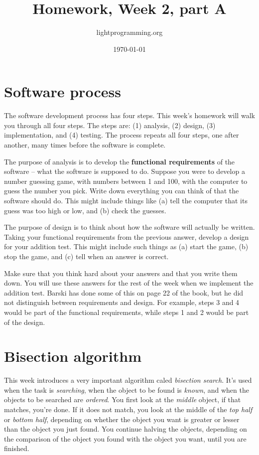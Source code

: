 \documentclass{article}
\title{Homework, Week 2, part A}
\author{lightprogramming.org}
\date{\today}
\begin{document}
\maketitle{}

\section{Software process}

The software development process has four steps. This week's homework will walk you through all four steps. The steps are: (1) analysis, (2) design, (3) implementation, and (4) testing. The process repeats all four steps, one after another, many times before the software is complete.

The purpose of analysis is to develop the \textbf{functional requirements} of the software -- what the software is supposed to do. Suppose you were to develop a number guessing game, with numbers between 1 and 100, with the computer to guess the number you pick. Write down everything you can think of that the software should do. This might include things like (a) tell the computer that its guess was too high or low, and (b) check the guesses.

The purpose of design is to think about how the software will actually be written. Taking your functional requirements from the previous answer, develop a design for your addition test. This might include such things as (a) start the game, (b) stop the game, and (c) tell when an answer is correct.

Make sure that you think hard about your answers and that you write them down. You will use these answers for the rest of the week when we implement the addition test. Barski has done some of this on page 22 of the book, but he did not distinguish between requirements and design. For example, steps 3 and 4 would be part of the functional requirements, while steps 1 and 2 would be part of the design.

\section{Bisection algorithm}

This week introduces a very important algorithm caled \textit{bisection search}. It's used when the task is \textit{searching}, when the object to be found is \textit{known}, and when the objects to be searched are \textit{ordered}. You first look at the \textit{middle} object, if that matches, you're done. If it does not match, you look at the middle of the \textit{top half} or \textit{bottom half}, depending on whether the object you want is greater or lesser than the object you just found. You continue halving the objects, depending on the comparison of the object you found with the object you want, until you are finished.
\end{document}
